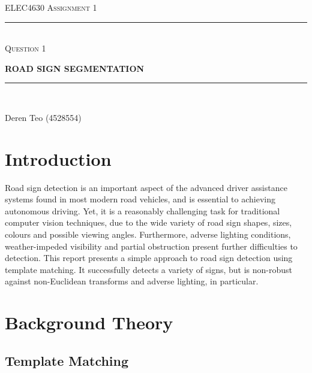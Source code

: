 \begin{titlepage}
    \centering

    \textsc{ELEC4630 Assignment 1}\\
    \vspace{9cm}

    \rule{\linewidth}{0.5pt}\\

    \vspace{1em}
    \LARGE\textsc{Question 1}\\
    \vspace{1em}

    \LARGE\uppercase{\textbf{{Road Sign Segmentation}}}\\

    \rule{\linewidth}{2pt}\\

    \vfill

    \normalsize{Deren Teo (4528554)}
    \vspace{1cm}

\end{titlepage}

\section{Introduction}

Road sign detection is an important aspect of the advanced driver assistance systems found in most modern road vehicles, and is essential to achieving autonomous driving. Yet, it is a reasonably challenging task for traditional computer vision techniques, due to the wide variety of road sign shapes, sizes, colours and possible viewing angles. Furthermore, adverse lighting conditions, weather-impeded visibility and partial obstruction present further difficulties to detection. This report presents a simple approach to road sign detection using template matching. It successfully detects a variety of signs, but is non-robust against non-Euclidean transforms and adverse lighting, in particular.

\section{Background Theory}

\subsection{Template Matching}

